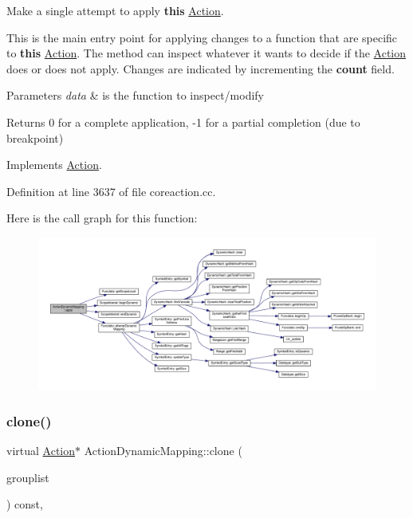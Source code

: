 Make a single attempt to apply {\bfseries{this}} \mbox{\hyperlink{class_action}{Action}}. 

This is the main entry point for applying changes to a function that are specific to {\bfseries{this}} \mbox{\hyperlink{class_action}{Action}}. The method can inspect whatever it wants to decide if the \mbox{\hyperlink{class_action}{Action}} does or does not apply. Changes are indicated by incrementing the {\bfseries{count}} field. 
\begin{DoxyParams}{Parameters}
{\em data} & is the function to inspect/modify \\
\hline
\end{DoxyParams}
\begin{DoxyReturn}{Returns}
0 for a complete application, -\/1 for a partial completion (due to breakpoint) 
\end{DoxyReturn}


Implements \mbox{\hyperlink{class_action_aac1c3999d6c685b15f5d9765a4d04173}{Action}}.



Definition at line 3637 of file coreaction.\+cc.

Here is the call graph for this function\+:
\nopagebreak
\begin{figure}[H]
\begin{center}
\leavevmode
\includegraphics[width=350pt]{class_action_dynamic_mapping_a4d91f3a0cca0be4f2600f5deff083cd8_cgraph}
\end{center}
\end{figure}
\mbox{\label{class_action_dynamic_mapping_a9c1315b992794205be6fc1ae3b419b16}} 
\subsubsection{\texorpdfstring{clone()}{clone()}}
{\footnotesize\ttfamily virtual \mbox{\hyperlink{class_action}{Action}}$\ast$ Action\+Dynamic\+Mapping\+::clone (\begin{DoxyParamCaption}\item[{const \mbox{\hyperlink{class_action_group_list}{Action\+Group\+List}} \&}]{grouplist }\end{DoxyParamCaption}) const\hspace{0.3cm}{\ttfamily [inline]}, {\ttfamily [virtual]}}



